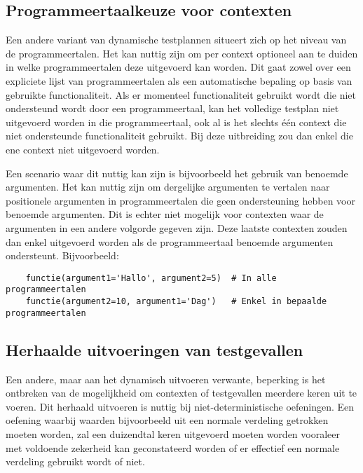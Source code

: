 \subsection{Programmeertaalkeuze voor contexten}\label{subsec:programmeertaalkeuze-voor-contexten}

Een andere variant van dynamische testplannen situeert zich op het niveau van de programmeertalen.
Het kan nuttig zijn om per context optioneel aan te duiden in welke programmeertalen deze uitgevoerd kan worden.
Dit gaat zowel over een expliciete lijst van programmeertalen als een automatische bepaling op basis van gebruikte functionaliteit.
Als er momenteel functionaliteit gebruikt wordt die niet ondersteund wordt door een programmeertaal, kan het volledige testplan niet uitgevoerd worden in die programmeertaal, ook al is het slechts één context die niet ondersteunde functionaliteit gebruikt.
Bij deze uitbreiding zou dan enkel die ene context niet uitgevoerd worden.

Een scenario waar dit nuttig kan zijn is bijvoorbeeld het gebruik van benoemde argumenten.
Het kan nuttig zijn om dergelijke argumenten te vertalen naar positionele argumenten in programmeertalen die geen ondersteuning hebben voor benoemde argumenten.
Dit is echter niet mogelijk voor contexten waar de argumenten in een andere volgorde gegeven zijn.
Deze laatste contexten zouden dan enkel uitgevoerd worden als de programmeertaal benoemde argumenten ondersteunt.
Bijvoorbeeld:

\begin{verbatim}
    functie(argument1='Hallo', argument2=5)  # In alle programmeertalen
    functie(argument2=10, argument1='Dag')   # Enkel in bepaalde programmeertalen
\end{verbatim}

\subsection{Herhaalde uitvoeringen van testgevallen}\label{subsec:herhaalde-uitvoeringen-van-testgevallen}

Een andere, maar aan het dynamisch uitvoeren verwante, beperking is het ontbreken van de mogelijkheid om contexten of testgevallen meerdere keren uit te voeren.
Dit herhaald uitvoeren is nuttig bij niet-deterministische oefeningen.
Een oefening waarbij waarden bijvoorbeeld uit een normale verdeling getrokken moeten worden, zal een duizendtal keren uitgevoerd moeten worden vooraleer met voldoende zekerheid kan geconstateerd worden of er effectief een normale verdeling gebruikt wordt of niet.

